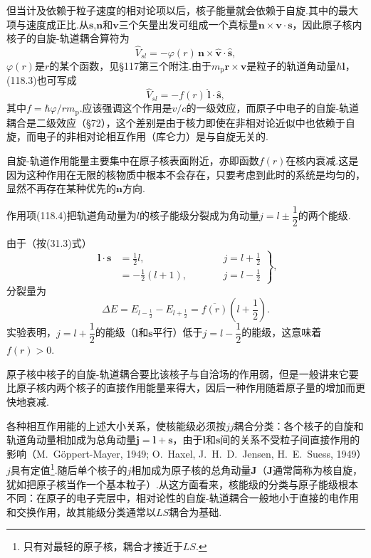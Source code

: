 但当计及依赖于粒子速度的相对论项以后，核子能量就会依赖于自旋.其中的最大项与速度成正比.从$\boldsymbol{s}$,$\boldsymbol{n}$和$\boldsymbol{v}$三个矢量出发可组成一个真标量$\boldsymbol{n}\times\boldsymbol{v}\cdot\boldsymbol{s}$，因此原子核内核子的自旋-轨道耦合算符为
\begin{equation}
  \hat{V}_{sl}=-\varphi(r)\,\boldsymbol{n}\times\hat{\boldsymbol{v}}\cdot\hat{\boldsymbol{s}},
\end{equation}
$\varphi(r)$是$r$的某个函数，见§117第三个附注.由于$m_\mathrm{p}\boldsymbol{r}\times\boldsymbol{v}$是粒子的轨道角动量$\hbar\boldsymbol{l}$，(118.3)也可写成
\begin{equation}
  \hat{V}_{sl}=-f(r)\,\hat{\boldsymbol{l}}\cdot\hat{\boldsymbol{s}},
\end{equation}
其中$f=\hbar\varphi/rm_\mathrm{p}$.应该强调这个作用是$v/c$的一级效应，而原子中电子的自旋-轨道耦合是二级效应（§72），这个差别是由于核力即使在非相对论近似中也依赖于自旋，而电子的非相对论相互作用（库仑力）是与自旋无关的.

自旋-轨道作用能量主要集中在原子核表面附近，亦即函数$f(r)$在核内衰减.这是因为这种作用在无限的核物质中根本不会存在，只要考虑到此时的系统是均匀的，显然不再存在某种优先的$\boldsymbol{n}$方向.

作用项(118.4)把轨道角动量为$l$的核子能级分裂成为角动量$j=l\pm\dfrac{1}{2}$的两个能级.

由于（按(31.3)式）
\begin{equation}
  \left.
  \begin{aligned}
    \boldsymbol{l}\cdot\boldsymbol{s}&=\frac{1}{2}l,
    &\qquad& j=l+\frac{1}{2}\\
    &=-\frac{1}{2}(l+1),&& j=l-\frac{1}{2}
  \end{aligned}
  \right\},
\end{equation}
分裂量为
\begin{equation}
  \Delta E=E_{l-\frac{1}{2}}-E_{l+\frac{1}{2}}
  =\overline{f(r)}\left(l+\frac{1}{2}\right).
\end{equation}
实验表明，$j=l+\dfrac{1}{2}$的能级（$\boldsymbol{l}$和$\boldsymbol{s}$平行）低于$j=l-\dfrac{1}{2}$的能级，这意味着$f(r)>0$.

原子核中核子的自旋-轨道耦合要比该核子与自洽场的作用弱，但是一般讲来它要比原子核内两个核子的直接作用能量来得大，因后一种作用随着原子量的增加而更快地衰减.

各种相互作用能的上述大小关系，使核能级必须按$jj$耦合分类：各个核子的自旋和轨道角动量相加成为总角动量$\boldsymbol{j}=\boldsymbol{l}+\boldsymbol{s}$，由于$\boldsymbol{l}$和$\boldsymbol{s}$间的关系不受粒子间直接作用的影响（M.~G\"oppert-Mayer, 1949; O.~Haxel, J.~H.~D.~Jensen, H.~E.~Suess, 1949）$j$具有定值\footnote{只有对最轻的原子核，耦合才接近于$LS$.}.随后单个核子的$j$相加成为原子核的总角动量$\boldsymbol{J}$（$\boldsymbol{J}$通常简称为核自旋，犹如把原子核当作一个基本粒子）.从这方面看来，核能级的分类与原子能级根本不同：在原子的电子壳层中，相对论性的自旋-轨道耦合一般地小于直接的电作用和交换作用，故其能级分类通常以$LS$耦合为基础.

